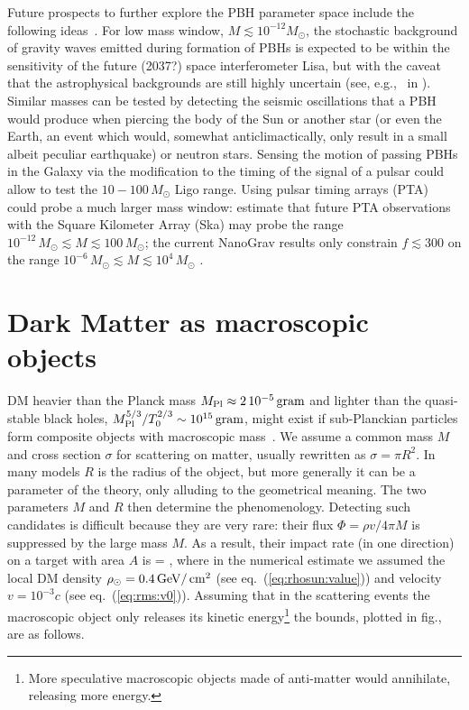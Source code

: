 \medskip

Future prospects to further explore the PBH parameter space include the following ideas~\cite{PBHperspectives}.
For  low mass window, $M \lesssim 10^{-12} M_\odot$, the stochastic background of gravity waves emitted during formation of PBHs is expected to be within the sensitivity of the future (2037?) space interferometer {\sc Lisa}, but with the caveat that the astrophysical backgrounds are still highly uncertain (see, e.g.,~ in \cite{PBHperspectives}).
Similar masses can be tested by detecting the seismic oscillations that a PBH would produce when piercing the body of the Sun or another star (or even the Earth, an event which would, somewhat anticlimactically, only result in a small albeit peculiar earthquake) or neutron stars.
Sensing the motion of passing PBHs in the Galaxy via the modification to the timing of the signal of a pulsar could allow to test the $10 - 100 \, M_\odot$  {\sc Ligo} range. Using pulsar timing arrays (PTA) could probe a much larger mass window:  estimate that future PTA observations with the Square Kilometer Array ({\sc Ska}) may probe the range $10^{-12} \, M_\odot \lesssim M \lesssim100 \, M_\odot$; 
the current {\sc NanoGrav} results only constrain $f\lesssim 300$ on the range $10^{-6} \, M_\odot \lesssim M \lesssim10^{4} \, M_\odot$ \cite{PTA}.  




\section{Dark Matter as macroscopic objects}\label{sec:DMmacro}
DM heavier than the Planck mass $M_{\rm Pl}\approx 2\, 10^{-5}\,{\rm gram}$ 
and lighter than the quasi-stable black holes,
$M_{\rm Pl}^{5/3}/T_0^{2/3} \sim 10^{15}\,{\rm gram}$,
might exist if sub-Planckian particles form composite objects with macroscopic mass~\cite{MacroscopicDM}.
We assume a common mass $M$ and cross section $\sigma$ for scattering on matter, usually rewritten as $\sigma = \pi R^2$.
In many models  $R$ is the radius of the object, but more generally it can be a parameter of the theory, only alluding to the geometrical meaning.
The two parameters $M$ and $R$ then determine the phenomenology.
Detecting such candidates is difficult because they are very rare: their flux
$\Phi = \rho v/4\pi M$ is suppressed by the large mass $M$.
As a result, their impact rate (in one direction) on a target with area $A$ is
\beq 
\Gamma = \approx {}  ,
 \eeq 
where in the numerical estimate we assumed the local DM density $\rho_{\odot}=0.4\,{\rm GeV}/\,{\rm cm}^2$ (see eq.~(\ref{eq:rhosun:value})) and velocity $v =10^{-3} c$ (see eq.~(\ref{eq:rms:v0})). 
 Assuming that in the scattering events the macroscopic object
 only releases its kinetic energy\footnote{More speculative macroscopic objects made of anti-matter would annihilate, releasing more energy.} the bounds, plotted in fig., are as follows.


